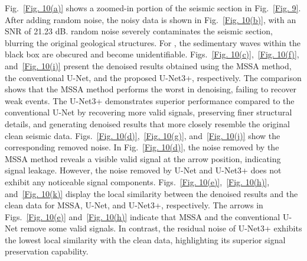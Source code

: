 \documentclass[preprint,12pt,authoryear]{elsarticle}
\begin{document}
Fig.~\ref{Fig. 10(a)} shows a zoomed-in portion of the seismic section in Fig.~\ref{Fig. 9}. After adding random noise, the noisy data is shown in Fig.~\ref{Fig. 10(b)}, with an SNR of 21.23 dB.   random noise severely contaminates the seismic section, blurring the original geological structures. For , the sedimentary waves within the black box are obscured and become unidentifiable. Figs.~\ref{Fig. 10(c)},~\ref{Fig. 10(f)}, and~\ref{Fig. 10(i)} present the denoised results obtained using the MSSA method, the conventional U-Net, and the proposed U-Net3+, respectively. The comparison shows that the MSSA method performs the worst in denoising, failing to recover weak events. The U-Net3+ demonstrates superior performance compared to the conventional U-Net by recovering more valid signals, preserving finer structural details, and generating denoised results that more closely resemble the original clean seismic data. Figs.~\ref{Fig. 10(d)},~\ref{Fig. 10(g)}, and~\ref{Fig. 10(j)} show the corresponding removed noise. In Fig.~\ref{Fig. 10(d)}, the noise removed by the MSSA method reveals a visible valid signal at the arrow position, indicating signal leakage. However, the noise removed by U-Net and U-Net3+ does not exhibit any noticeable signal components. Figs.~\ref{Fig. 10(e)},~\ref{Fig. 10(h)}, and~\ref{Fig. 10(k)} display the local similarity between the denoised results and the clean data for MSSA, U-Net, and U-Net3+, respectively. The arrows in Figs.~\ref{Fig. 10(e)} and~\ref{Fig. 10(h)} indicate that MSSA and the conventional U-Net remove some valid signals. In contrast, the residual noise of U-Net3+ exhibits the lowest local similarity with the clean data, highlighting its superior signal preservation capability.
\end{document}
